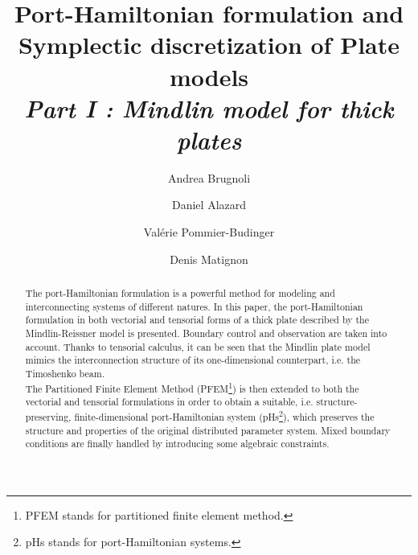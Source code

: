 \documentclass[preprint,12pt]{elsarticle}
\begin{document}
	\begin{frontmatter}	
		
		\title{Port-Hamiltonian formulation and \\ Symplectic discretization of Plate models \\
		\vspace{2mm}\large\textit{Part I : Mindlin model for thick plates}}	
		\author[ISAE]{Andrea Brugnoli}
		
		\author[ISAE]{Daniel Alazard}
		
		\author[ISAE]{Valérie Pommier-Budinger}
		
		\author[ISAE]{Denis Matignon}
		
		
		
		\address[ISAE]{ISAE-SUPAERO, Université de Toulouse, France.\\
		\vspace{2mm} {10 Avenue Edouard Belin, BP-54032, 31055 Toulouse Cedex 4.}}
		
		\begin{abstract}
		The port-Hamiltonian formulation is a powerful method  for modeling and interconnecting systems of different natures. In this paper, the port-Hamiltonian formulation in both vectorial and tensorial forms of a thick plate described  by the Mindlin-Reissner model is presented. Boundary control and observation are taken into account. Thanks to tensorial calculus, it can be seen that the Mindlin plate model mimics the interconnection structure of its one-dimensional counterpart, i.e. the Timoshenko beam.\\
        The Partitioned Finite Element Method (PFEM\footnote{PFEM stands for partitioned finite element method.}) is then extended to both the vectorial and tensorial formulations in order to obtain a suitable, i.e. structure-preserving, finite-dimensional port-Hamiltonian system (pHs\footnote{pHs stands for port-Hamiltonian systems.}), which preserves the structure and properties of the original distributed parameter system. Mixed boundary conditions are finally handled by introducing some algebraic constraints.
		\end{abstract}
		

\end{frontmatter}
\end{document}
